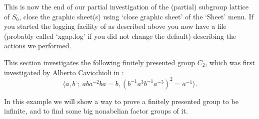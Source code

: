 %
%
%
%


This is  now the  end of our  partial  investigation of  the (partial)
subgroup  lattice  of $S_6$, close  the  graphic sheet(s) using `close
graphic sheet' of the `Sheet' menu. If you started the logging facility
of {\XGAP} as described above you now have a file (probably called
`xgap.log' if you did not change the default) describing the actions
we performed.



This  section  investigates the  following  finitely presented group $C_2$,
which was first investigated by Alberto Cavicchioli in \cite{Cav86}:
$$
\langle a, b \;;\; aba^{-2}ba=b, (b^{-1}a^3b^{-1}a^{-3})^2=a^{-1}\rangle.
$$

In this example we will show a way to prove a finitely presented group
to be infinite, and to find some big nonabelian factor groups of it.

